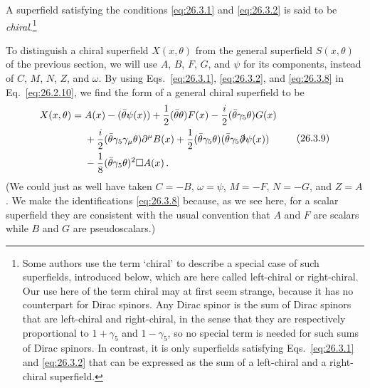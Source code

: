 A superfield satisfying the conditions \eqref{eq:26.3.1} and
\eqref{eq:26.3.2} is said to be
\emph{chiral}.\footnote{Some authors use the term `chiral' to describe a
special case of such superfields, introduced below, which are here called
left-chiral or right-chiral. Our use here of the term chiral may at first seem
strange, because it has no counterpart for Dirac spinors. Any Dirac spinor is
the sum of Dirac spinors that are left-chiral and right-chiral, in the sense
that they are respectively proportional to $1+\gamma_5$ and $1-\gamma_5$, so
no special term is needed for such sums of Dirac spinors. In contrast, it is
only superfields satisfying Eqs.~\eqref{eq:26.3.1} and \eqref{eq:26.3.2} that
can be expressed as the sum of a left-chiral and a right-chiral superfield.}

To distinguish a chiral superfield $X(x,\theta)$ from the general superfield
$S(x,\theta)$ of the previous section, we will use $A$, $B$, $F$, $G$, and
$\psi$ for its components, instead of $C$, $M$, $N$, $Z$, and $\omega$. By
using Eqs.~\eqref{eq:26.3.1}, \eqref{eq:26.3.2}, and \eqref{eq:26.3.8} in
Eq.~\eqref{eq:26.2.10}, we find the form of a general chiral superfield to be
\begin{equation}
  \begin{aligned}
  X(x,\theta)={}&A(x)-(\bar\theta\psi(x))
  +\frac12(\bar\theta\theta)F(x)
  -\frac{i}{2}(\bar\theta\gamma_5\theta)G(x)
  \\
  &+\frac{i}{2}(\bar\theta\gamma_5\gamma_\mu\theta)
    \partial^\mu B(x)
  +\frac12(\bar\theta\gamma_5\theta)
    (\bar\theta\gamma_5\sl{\partial}\psi(x))
  \\
  &-\frac18(\bar\theta\gamma_5\theta)^2\Box A(x)\,.
  \end{aligned}
  \tag{26.3.9}\label{eq:26.3.9}
\end{equation}
(We could just as well have taken $C=-B$, $\omega=\psi$, $M=-F$, $N=-G$,
and $Z=A$. We make the identifications \eqref{eq:26.3.8} because, as we see
here, for a scalar superfield they are consistent with the usual convention
that $A$ and $F$ are scalars while $B$ and $G$ are pseudoscalars.)

